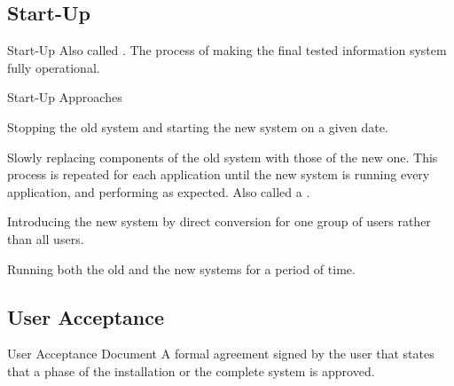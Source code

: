 \documentclass[\main/notes.tex]{subfiles}
\begin{document}
				\subsection{Start-Up}
					\begin{definition}{Start-Up}
						Also called . The process of making the final tested information system fully operational.
					\end{definition}
					\begin{sidenote}{Start-Up Approaches}
						\begin{description}[nosep]
							\item[Direct Conversion] Stopping the old system and starting the new system on a given date.
							\item[Phase-in Approach] Slowly replacing components of the old system with those of the new one. This process is repeated for each application until the new system is running every application, and performing as expected. Also called a \concept{piecemeal approach}.
							\item[Pilot Running] Introducing the new system by direct conversion for one group of users rather than all users.
							\item[Parallel Running] Running both the old and the new systems for a period of time.
						\end{description}
					\end{sidenote}
				\subsection{User Acceptance}
					\begin{definition}{User Acceptance Document}
						A formal agreement signed by the user that states that a phase of the installation or the complete system is approved.
					\end{definition}

	\vbox{}
\end{document}

